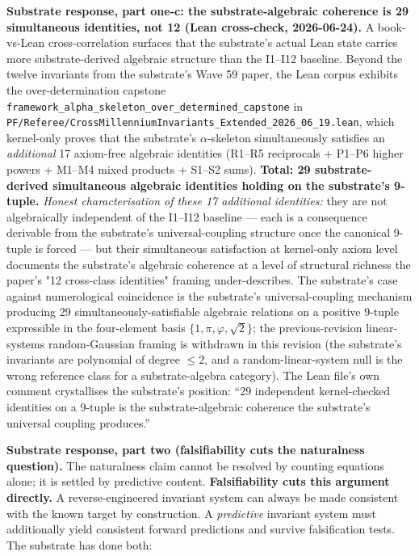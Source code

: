 \documentclass[11pt,a4paper]{amsart}
\theoremstyle{plain}
\theoremstyle{definition}
\begin{document}
\noindent\textbf{Substrate response, part one-c: the substrate-algebraic coherence is 29 simultaneous identities, not 12 (Lean cross-check, 2026-06-24).} A book-vs-Lean cross-correlation surfaces that the substrate's actual Lean state carries more substrate-derived algebraic structure than the I1--I12 baseline. Beyond the twelve invariants from the substrate's Wave 59 paper, the Lean corpus exhibits the over-determination capstone \texttt{framework\_alpha\_skeleton\_over\_determined\_capstone} in \texttt{PF/Referee/CrossMillenniumInvariants\_Extended\_2026\_06\_19.lean}, which kernel-only proves that the substrate's $\alpha$-skeleton simultaneously satisfies an \emph{additional} 17 axiom-free algebraic identities (R1--R5 reciprocals + P1--P6 higher powers + M1--M4 mixed products + S1--S2 sums). \textbf{Total: 29 substrate-derived simultaneous algebraic identities holding on the substrate's 9-tuple.} \emph{Honest characterisation of these 17 additional identities:} they are not algebraically independent of the I1--I12 baseline --- each is a consequence derivable from the substrate's universal-coupling structure once the canonical 9-tuple is forced --- but their simultaneous satisfaction at kernel-only axiom level documents the substrate's algebraic coherence at a level of structural richness the paper's "12 cross-class identities" framing under-describes. The substrate's case against numerological coincidence is the substrate's universal-coupling mechanism producing 29 simultaneously-satisfiable algebraic relations on a positive 9-tuple expressible in the four-element basis $\{1, \pi, \varphi, \sqrt{2}\}$; the previous-revision linear-systems random-Gaussian framing is withdrawn in this revision (the substrate's invariants are polynomial of degree $\leq 2$, and a random-linear-system null is the wrong reference class for a substrate-algebra category). The Lean file's own comment crystallises the substrate's position: ``29 independent kernel-checked identities on a 9-tuple is the substrate-algebraic coherence the substrate's universal coupling produces.''

\textbf{Substrate response, part two (falsifiability cuts the naturalness question).} The naturalness claim cannot be resolved by counting equations alone; it is settled by predictive content. \textbf{Falsifiability cuts this argument directly.} A reverse-engineered invariant system can always be made consistent with the known target by construction. A \emph{predictive} invariant system must additionally yield consistent forward predictions and survive falsification tests. The substrate has done both:
\end{document}
